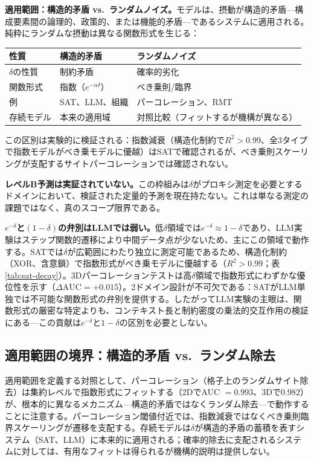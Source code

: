 \documentclass[11pt,a4paper]{article}
\begin{document}
\textbf{適用範囲：構造的矛盾 vs.\ ランダムノイズ。}モデルは、摂動が構造的矛盾---構成要素間の論理的、政策的、または機能的矛盾---であるシステムに適用される。純粋にランダムな摂動は異なる関数形式を生じる：

\begin{center}
\small
\begin{tabular}{lll}
\toprule
\textbf{性質} & \textbf{構造的矛盾} & \textbf{ランダムノイズ} \\
\midrule
$\delta$の性質 & 制約矛盾 & 確率的劣化 \\
関数形式 & 指数（$e^{-\alpha\delta}$） & べき乗則/臨界 \\
例 & SAT、LLM、組織 & パーコレーション、RMT \\
存続モデル & 本来の適用域 & 対照比較（フィットするが機構が異なる） \\
\bottomrule
\end{tabular}
\end{center}

この区別は実験的に検証される：指数減衰（構造化制約で$R^2 > 0.99$、全3タイプで指数モデルがべき乗モデルに優越）はSATで確認されるが、べき乗則スケーリングが支配するサイトパーコレーションでは確認されない。

\textbf{レベルB予測は実証されていない。}この枠組みは$\delta$がプロキシ測定を必要とするドメインにおいて、検証された定量的予測を現在持たない。これは単なる測定の課題ではなく、真のスコープ限界である。

\textbf{$e^{-\delta}$と$(1-\delta)$の弁別はLLMでは弱い。}低$\delta$領域では$e^{-\delta} \approx 1 - \delta$であり、LLM実験はステップ関数的遷移により中間データ点が少ないため、主にこの領域で動作する。SATでは$\delta$が広範囲にわたり独立に測定可能であるため、構造化制約（XOR、含意鎖）で指数形式がべき乗モデルに優越する（$R^2 > 0.99$；表\ref{tab:sat-decay}）。3Dパーコレーションテストは高$\delta$領域で指数形式にわずかな優位性を示す（$\Delta\text{AUC} = +0.015$）。2ドメイン設計が不可欠である：SATがLLM単独では不可能な関数形式の弁別を提供する。したがってLLM実験の主眼は、関数形式の厳密な特定よりも、コンテキスト長と制約密度の乗法的交互作用の検証にある---この貢献は$e^{-\delta}$と$1-\delta$の区別を必要としない。

\subsection{適用範囲の境界：構造的矛盾 vs.\ ランダム除去}

適用範囲を定義する対照として、パーコレーション（格子上のランダムサイト除去）は集約レベルで指数形式にフィットする（2DでAUC $= 0.993$、3Dで$0.982$）が、根本的に異なるメカニズム---構造的矛盾ではなくランダム除去---で動作することに注意する。パーコレーション閾値付近では、指数減衰ではなくべき乗則臨界スケーリングが遷移を支配する。存続モデルは$\delta$が構造的矛盾の蓄積を表すシステム（SAT、LLM）に本来的に適用される；確率的除去に支配されるシステムに対しては、有用なフィットは得られるが機構的説明は提供しない。
\end{document}
